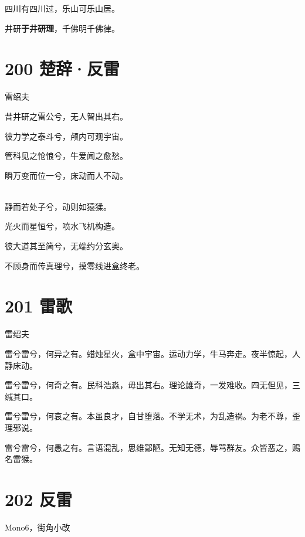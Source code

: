 \documentclass[UTF8,12pt,oneside]{ctexbook}
\begin{document}
        \begin{center}
        四川有四川过，乐山可乐山居。
        
        井研\textbf{于井研理}，千佛明千佛律。
        \end{center}

        \newpage

        \section{200 楚辞·反雷}
        \begin{center}
            雷绍夫
        \end{center}
        
        \begin{center}
        昔井研之雷公兮，无人智出其右。
        
        彼力学之泰斗兮，颅内可观宇宙。
        
        管科见之怆悢兮，牛爱闻之愈愁。
        
        瞬万变而位一兮，床动而人不动。
        
        ~\\
        静而若处子兮，动则如猿猱。
        
        光火而星恒兮，喷水飞机构造。
        
        彼大道其至简兮，无端约分玄奥。
        
        不顾身而传真理兮，摸零线进盒终老。
        \end{center}

        \section{201 雷歌}
        \begin{center}
            雷绍夫
        \end{center}
        
        雷兮雷兮，何异之有。蜡烛星火，盒中宇宙。运动力学，牛马奔走。夜半惊起，人静床动。

        雷兮雷兮，何奇之有。民科浩淼，毋出其右。理论雄奇，一发难收。四无但见，三缄其口。

        雷兮雷兮，何哀之有。本虽良才，自甘堕落。不学无术，为乱造祸。为老不尊，歪理邪说。

        雷兮雷兮，何愚之有。言语混乱，思维鄙陋。无知无德，辱骂群友。众皆恶之，赐名雷猴。

        \section{202 反雷}
        \begin{center}
            Mono6，街角小改
        \end{center}
        
\end{document}
